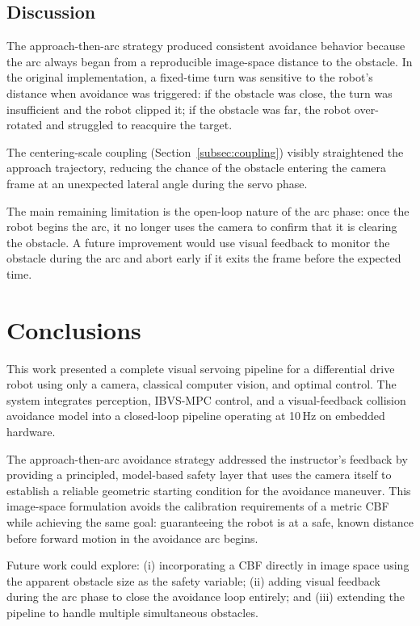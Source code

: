 \documentclass[journal, 10pt]{IEEEtran}
\begin{document}
\subsection{Discussion}

The approach-then-arc strategy produced consistent avoidance behavior
because the arc always began from a reproducible image-space distance to
the obstacle. In the original implementation, a fixed-time turn was
sensitive to the robot's distance when avoidance was triggered: if the
obstacle was close, the turn was insufficient and the robot clipped it; if
the obstacle was far, the robot over-rotated and struggled to reacquire the
target.

The centering-scale coupling (Section~\ref{subsec:coupling}) visibly
straightened the approach trajectory, reducing the chance of the obstacle
entering the camera frame at an unexpected lateral angle during the servo
phase.

The main remaining limitation is the open-loop nature of the arc phase:
once the robot begins the arc, it no longer uses the camera to confirm
that it is clearing the obstacle. A future improvement would use
visual feedback to monitor the obstacle during the arc and abort early if
it exits the frame before the expected time.

\section{Conclusions}
\label{sec:conclusions}

This work presented a complete visual servoing pipeline for a differential
drive robot using only a camera, classical computer vision, and optimal
control. The system integrates perception, IBVS-MPC control, and a
visual-feedback collision avoidance model into a closed-loop pipeline
operating at 10\,Hz on embedded hardware.

The approach-then-arc avoidance strategy addressed the instructor's
feedback by providing a principled, model-based safety layer that uses the
camera itself to establish a reliable geometric starting condition for the
avoidance maneuver. This image-space formulation avoids the calibration
requirements of a metric CBF while achieving the same goal: guaranteeing
the robot is at a safe, known distance before forward motion in the
avoidance arc begins.

Future work could explore: (i) incorporating a CBF directly in image space
using the apparent obstacle size as the safety variable; (ii) adding visual
feedback during the arc phase to close the avoidance loop entirely; and
(iii) extending the pipeline to handle multiple simultaneous obstacles.
\end{document}

